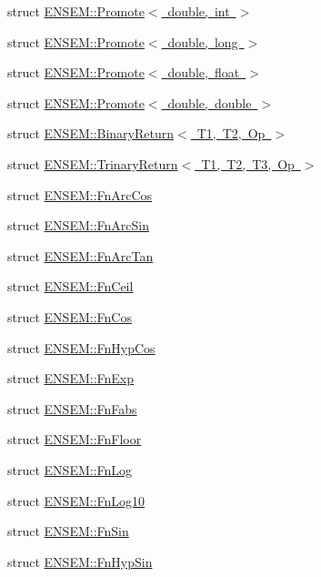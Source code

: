 \begin{DoxyCompactItemize}
\item 
struct \mbox{\hyperlink{structENSEM_1_1Promote_3_01double_00_01int_01_4}{E\+N\+S\+E\+M\+::\+Promote$<$ double, int $>$}}
\item 
struct \mbox{\hyperlink{structENSEM_1_1Promote_3_01double_00_01long_01_4}{E\+N\+S\+E\+M\+::\+Promote$<$ double, long $>$}}
\item 
struct \mbox{\hyperlink{structENSEM_1_1Promote_3_01double_00_01float_01_4}{E\+N\+S\+E\+M\+::\+Promote$<$ double, float $>$}}
\item 
struct \mbox{\hyperlink{structENSEM_1_1Promote_3_01double_00_01double_01_4}{E\+N\+S\+E\+M\+::\+Promote$<$ double, double $>$}}
\item 
struct \mbox{\hyperlink{structENSEM_1_1BinaryReturn}{E\+N\+S\+E\+M\+::\+Binary\+Return$<$ T1, T2, Op $>$}}
\item 
struct \mbox{\hyperlink{structENSEM_1_1TrinaryReturn}{E\+N\+S\+E\+M\+::\+Trinary\+Return$<$ T1, T2, T3, Op $>$}}
\item 
struct \mbox{\hyperlink{structENSEM_1_1FnArcCos}{E\+N\+S\+E\+M\+::\+Fn\+Arc\+Cos}}
\item 
struct \mbox{\hyperlink{structENSEM_1_1FnArcSin}{E\+N\+S\+E\+M\+::\+Fn\+Arc\+Sin}}
\item 
struct \mbox{\hyperlink{structENSEM_1_1FnArcTan}{E\+N\+S\+E\+M\+::\+Fn\+Arc\+Tan}}
\item 
struct \mbox{\hyperlink{structENSEM_1_1FnCeil}{E\+N\+S\+E\+M\+::\+Fn\+Ceil}}
\item 
struct \mbox{\hyperlink{structENSEM_1_1FnCos}{E\+N\+S\+E\+M\+::\+Fn\+Cos}}
\item 
struct \mbox{\hyperlink{structENSEM_1_1FnHypCos}{E\+N\+S\+E\+M\+::\+Fn\+Hyp\+Cos}}
\item 
struct \mbox{\hyperlink{structENSEM_1_1FnExp}{E\+N\+S\+E\+M\+::\+Fn\+Exp}}
\item 
struct \mbox{\hyperlink{structENSEM_1_1FnFabs}{E\+N\+S\+E\+M\+::\+Fn\+Fabs}}
\item 
struct \mbox{\hyperlink{structENSEM_1_1FnFloor}{E\+N\+S\+E\+M\+::\+Fn\+Floor}}
\item 
struct \mbox{\hyperlink{structENSEM_1_1FnLog}{E\+N\+S\+E\+M\+::\+Fn\+Log}}
\item 
struct \mbox{\hyperlink{structENSEM_1_1FnLog10}{E\+N\+S\+E\+M\+::\+Fn\+Log10}}
\item 
struct \mbox{\hyperlink{structENSEM_1_1FnSin}{E\+N\+S\+E\+M\+::\+Fn\+Sin}}
\item 
struct \mbox{\hyperlink{structENSEM_1_1FnHypSin}{E\+N\+S\+E\+M\+::\+Fn\+Hyp\+Sin}}

\end{DoxyCompactItemize}
